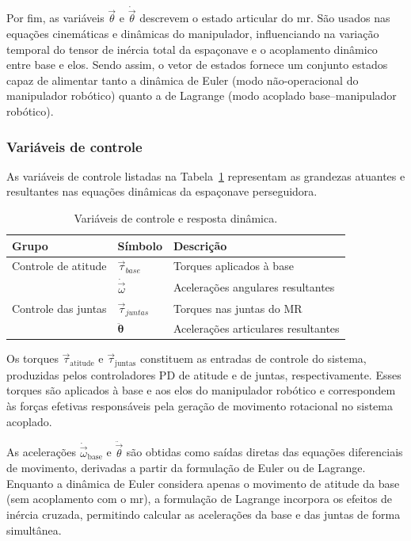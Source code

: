 Por fim, as variáveis $\vec{\theta}$ e $\dot{\vec{\theta}}$ descrevem o estado articular do \gls{mr}.  
São usados nas equações cinemáticas e dinâmicas do manipulador, influenciando na variação temporal do tensor de inércia total da espaçonave e o acoplamento dinâmico entre base e elos.  
Sendo assim, o vetor de estados fornece um conjunto estados capaz de alimentar tanto a dinâmica de Euler (modo não-operacional do manipulador robótico) quanto a de Lagrange (modo acoplado base--manipulador robótico).

\subsubsection{Variáveis de controle}
As variáveis de controle listadas na Tabela~\ref{tab:torques_aceleracoes} representam as grandezas atuantes e resultantes nas equações dinâmicas da espaçonave perseguidora.  

\begin{table}[ht]
\centering
\caption{Variáveis de controle e resposta dinâmica.}
\label{tab:torques_aceleracoes}
\begin{tabular}{lll}
\toprule
\textbf{Grupo} & \textbf{Símbolo} & \textbf{Descrição} \\ 
\midrule
Controle de atitude &
$\vec{\tau}_{base}$ &
Torques aplicados à base \\[2pt]
 &
$\dot{\vec{\omega}}$ &
Acelerações angulares resultantes \\[3pt]
Controle das juntas &
$\vec{\tau}_{juntas}$ &
Torques nas juntas do MR \\[2pt]
 &
$\ddot{\boldsymbol{\theta}}$ &
Acelerações articulares resultantes \\[2pt]
\bottomrule
\end{tabular}
\end{table}

Os torques $\vec{\tau}_{\text{atitude}}$ e $\vec{\tau}_{\text{juntas}}$ constituem as entradas de controle do sistema, produzidas pelos controladores PD de atitude e de juntas, respectivamente.  
Esses torques são aplicados à base e aos elos do manipulador robótico e correspondem às forças efetivas responsáveis pela geração de movimento rotacional no sistema acoplado.

As acelerações $\dot{\vec{\omega}}_{\text{base}}$ e $\ddot{\vec{\theta}}$ são obtidas como saídas diretas das equações diferenciais de movimento, derivadas a partir da formulação de Euler ou de Lagrange.  
Enquanto a dinâmica de Euler considera apenas o movimento de atitude da base (sem acoplamento com o \gls{mr}), a formulação de Lagrange incorpora os efeitos de inércia cruzada, permitindo calcular as acelerações da base e das juntas de forma simultânea.

